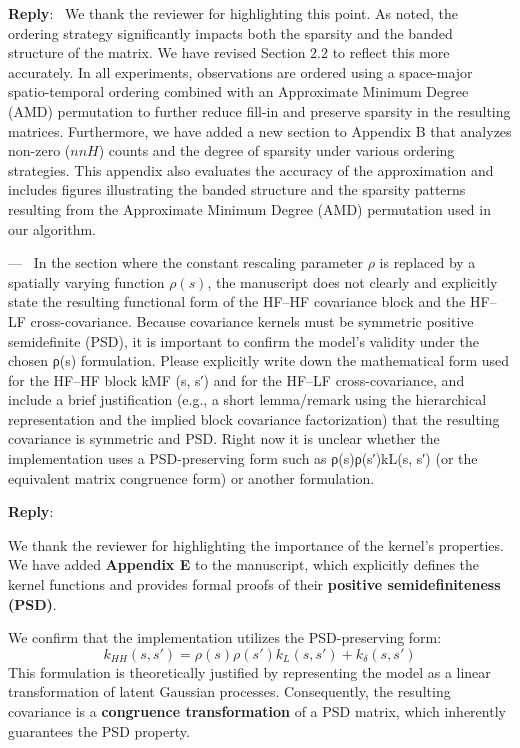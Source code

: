 \documentclass[12pt]{article}
\newcommand{\0}{\mathbf{0}}
\newcounter{reviewer}
\newcounter{point}[reviewer]
\renewcommand{\thepoint}{P\,\thereviewer.\arabic{point}}
\newenvironment{point}
   {\refstepcounter{point} \bigskip \noindent {\textbf{Point~\thepoint} } ---\ }
   {\par }
\newenvironment{reply}
   {\medskip \noindent \begin{sf}\color{Blue}\textbf{Reply}:\  }
   {\medskip \end{sf}}
\begin{document}
\begin{reply}
We thank the reviewer for highlighting this point. As noted, the ordering strategy significantly impacts both the sparsity and the banded structure of the matrix. We have revised Section 2.2 to reflect this more accurately. In all experiments, observations are ordered using a space-major spatio-temporal ordering combined with an Approximate Minimum Degree (AMD) permutation to further reduce fill-in and preserve sparsity in the resulting matrices.
Furthermore, we have added a new section to Appendix B that analyzes non-zero ($nnH$) counts and the degree of sparsity under various ordering strategies. This appendix also evaluates the accuracy of the approximation and includes figures illustrating the banded structure and the sparsity patterns resulting from the Approximate Minimum Degree (AMD) permutation used in our algorithm.
\end{reply}

\begin{point}
In the section where the constant rescaling parameter $\rho$ is replaced by
a spatially varying function $\rho(s)$, the manuscript does not clearly and
explicitly state the resulting functional form of the HF–HF covariance
block and the HF–LF cross-covariance. Because covariance kernels must
be symmetric positive semidefinite (PSD), it is important to confirm the
model’s validity under the chosen ρ(s) formulation. Please explicitly
write down the mathematical form used for the HF–HF block kMF (s, s′)
and for the HF–LF cross-covariance, and include a brief justification
(e.g., a short lemma/remark using the hierarchical representation and the
implied block covariance factorization) that the resulting covariance is symmetric and PSD. Right now it is unclear whether the implementation
uses a PSD-preserving form such as ρ(s)ρ(s′)kL(s, s′) (or the equivalent
matrix congruence form) or another formulation.
\end{point}

\begin{reply}

We thank the reviewer for highlighting the importance of the kernel's properties. We have added \textbf{Appendix E} to the manuscript, which explicitly defines the kernel functions and provides formal proofs of their \textbf{positive semidefiniteness (PSD)}. 

We confirm that the implementation utilizes the PSD-preserving form:
\begin{equation*}
    k_{HH}(s, s') = \rho(s)\rho(s')k_L(s, s') + k_\delta(s, s')
\end{equation*}
This formulation is theoretically justified by representing the model as a linear transformation of latent Gaussian processes. Consequently, the resulting covariance is a \textbf{congruence transformation} of a PSD matrix, which inherently guarantees the PSD property.
\end{reply}
\end{document}
